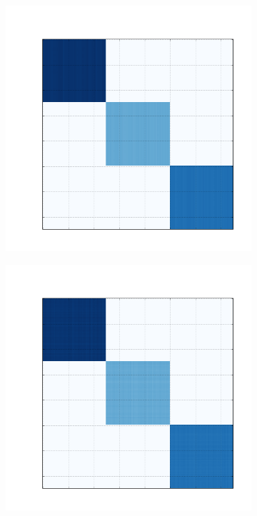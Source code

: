 \documentclass[10pt]{beamer}
\begin{document}
\begin{frame}
\begin{figure}[H]
\begin{subfigure}[b]{0.13\textwidth}
      \end{subfigure}
      \begin{subfigure}[b]{0.13\textwidth}
          \includegraphics[width=\textwidth]{img/b-reconstruction-fkmeans.png}
      \end{subfigure}
      \begin{subfigure}[b]{0.13\textwidth}
          \includegraphics[width=\textwidth]{img/b-reconstruction-onmtf.png}

\end{subfigure}
\end{figure}
\end{frame}
\end{document}
